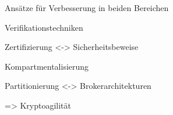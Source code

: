 \begin{frame}[c]{Ansätze für Verbesserung in beiden Bereichen}

  Verifikationstechniken
  \vspace{0.5em}

  {\footnotesize Zertifizierung <-> Sicherheitsbeweise}
  \vspace{1.5em}

  Kompartmentalisierung
  \vspace{0.5em}

  {\footnotesize Partitionierung <-> Brokerarchitekturen}
  \vspace{1.5em}


  => Kryptoagilität
\end{frame}
